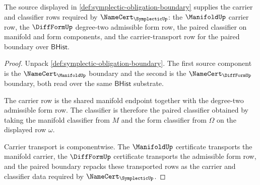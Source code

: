 \begin{theorem}
\label{thm:symplectic-carrier-classifier-obligations}
The source displayed in \autoref{def:symplectic-obligation-boundary} supplies the carrier and classifier rows required by $\NameCert_{\SymplecticUp}$: the $\ManifoldUp$ carrier row, the $\DiffFormUp$ degree-two admissible form row, the paired classifier on manifold and form components, and the carrier-transport row for the paired boundary over $\mathsf{BHist}$.
\end{theorem}
\begin{proof}
Unpack \autoref{def:symplectic-obligation-boundary}. The first source component is the $\NameCert_{\ManifoldUp}$ boundary and the second is the $\NameCert_{\DiffFormUp}$ boundary, both read over the same $\mathsf{BHist}$ substrate.

The carrier row is the shared manifold endpoint together with the degree-two admissible form row. The classifier is therefore the paired classifier obtained by taking the manifold classifier from $M$ and the form classifier from $\Omega$ on the displayed row $\omega$.

Carrier transport is componentwise. The $\ManifoldUp$ certificate transports the manifold carrier, the $\DiffFormUp$ certificate transports the admissible form row, and the paired boundary repacks these transported rows as the carrier and classifier data required by $\NameCert_{\SymplecticUp}$.
\end{proof}

